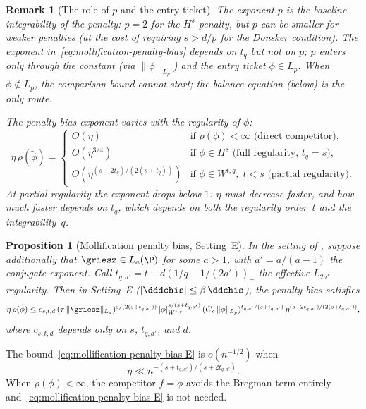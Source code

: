 \documentclass{article}
\newtheorem{proposition}[theorem]{Proposition}
\newtheorem{remark}{Remark}[section]
\begin{document}
\begin{remark}[The role of $p$ and the entry ticket]
\label{rem:entry-ticket}
The exponent $p$ is the baseline integrability
of the penalty:
$p = 2$ for the $H^s$ penalty,
but $p$ can be smaller for weaker penalties
(at the cost of requiring $s > d/p$
for the Donsker condition).
The exponent in~\eqref{eq:mollification-penalty-bias}
depends on $t_q$ but not on $p$;
$p$ enters only through the constant
(via $\|\phi\|_{L_p}$)
and the \emph{entry ticket} $\phi \in L_p$.
When $\phi \notin L_p$,
the comparison bound cannot start;
the balance equation (below)
is the only route.

The penalty bias exponent varies
with the regularity of $\phi$:
\[
\eta\,\rho(\tilde\phi)
  = \begin{cases}
    O(\eta) & \text{if } \rho(\phi) < \infty
      \text{ (direct competitor)}, \\
    O(\eta^{3/4}) & \text{if } \phi \in H^s
      \text{ (full regularity, $t_q = s$)}, \\
    O(\eta^{(s+2t_q)/(2(s+t_q))})
      & \text{if } \phi \in W^{t,q},\;
        t < s
      \text{ (partial regularity)}.
  \end{cases}
\]
At partial regularity the exponent drops below $1$:
$\eta$ must decrease faster,
and how much faster depends on $t_q$,
which depends on both
the regularity order~$t$
and the integrability~$q$.
\end{remark}

\begin{proposition}[Mollification penalty bias, Setting~E]
\label{prop:penalty-bias-E}
In the setting
of ,
suppose additionally that
$\griesz \in L_a(\P)$
for some $a > 1$,
with $a' = a/(a-1)$ the conjugate exponent.
Call $t_{q,a'} = t - d(1/q - 1/(2a'))_+$
the effective $L_{2a'}$ regularity.
Then in Setting~E
($|\dddchis| \le \beta\,\ddchis$),
the penalty bias satisfies
\begin{equation}
\label{eq:mollification-penalty-bias-E}
\eta\,\rho(\tilde\phi)
  \le c_{s,t,d}\,
  (\tau\,\|\griesz\|_{L_a})^{s/(2(s+t_{q,a'}))}\,
  |\phi|_{W^{t,q}}^{s/(s+t_{q,a'})}\,
  (C_\rho\,\|\phi\|_{L_p})^{t_{q,a'}/(s+t_{q,a'})}\,
  \eta^{(s + 2t_{q,a'})/(2(s + t_{q,a'}))},
\end{equation}
where $c_{s,t,d}$ depends only on $s$, $t_{q,a'}$, and $d$.
\end{proposition}

The bound~\eqref{eq:mollification-penalty-bias-E}
is $o(n^{-1/2})$ when
\begin{equation}
\label{eq:lambda-upper-E}
\eta \ll n^{-(s + t_{q,a'})/(s + 2t_{q,a'})}.
\end{equation}
When $\rho(\phi) < \infty$,
the competitor $f = \phi$ avoids
the Bregman term entirely
and~\eqref{eq:mollification-penalty-bias-E}
is not needed.
\end{document}
